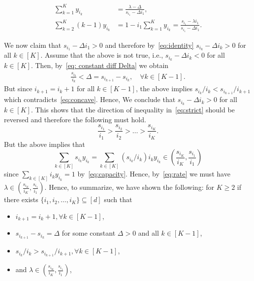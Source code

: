 \documentclass[a4paper]{article}
\theoremstyle{plain}
\theoremstyle{definition}
\theoremstyle{case}
\theoremstyle{remark}
\newcommand{\brac}[1]{\left(#1\right)}
\begin{document}
\begin{enumerate}
        \begin{align}
            \sum_{k=1}^K y_{i_k} &= \frac{\lambda - \Delta}{s_{i_1} - \Delta i_1}, \label{eq: first K sum subcase2}
            \\
            \sum_{k=2}^K (k-1) y_{i_k} &= 1- i_1\sum_{k=1}^K y_{i_k} = \frac{s_{i_1}-\lambda i_1}{s_{i_1}-\Delta i_1}. \label{eq: first K-1 sum subcase2}
        \end{align}

        We now claim that $s_{i_1}-\Delta i_{1} > 0$ and therefore by~\eqref{eq:identity} $s_{i_k}-\Delta i_k >0$ for all $k \in [K]$.
        Assume that the above is not true, i.e., $s_{i_k}-\Delta i_k < 0$ for all $k \in [K]$. Then, by~\eqref{eq: constant diff Delta} we obtain
        \begin{align}
            \frac{s_{i_k}}{i_k} < \Delta  = s_{i_{k+1}} - s_{i_k}, \quad \forall k \in [K-1].
            \label{eq:strict}
        \end{align}
        But since $i_{k+1}=i_k+1$ for all $k \in [K-1]$, the above implies $s_{i_{k}}/i_k < s_{i_{k+1}}/i_{k+1}$ which contradicts~\eqref{eq:concave}. Hence, We conclude that $s_{i_k}-\Delta i_k >0$ for all $k \in [K]$. This shows that the direction of inequality in~\eqref{eq:strict} should be reversed and therefore the following must hold.
        \begin{equation}
            \frac{s_{i_1}}{i_1} > \frac{s_{i_2}}{i_2} > \ldots > \frac{s_{i_K}}{i_K}.
        \end{equation}
        But the above implies that $$\sum_{k\in [K]} s_{i_k} y_{i_k}=\sum_{k\in [K]} (s_{i_k}/i_k) i_k y_{i_k} \in \brac{\frac{s_{i_K}}{i_K},\frac{s_{i_1}}{i_1}}$$ since $\sum_{k \in [K]} i_k y_{i_k}=1$ by~\eqref{eq:capacity}.
        Hence, by~\eqref{eq:rate} we must have
        $\lambda \in \brac{\frac{s_{i_K}}{i_K},\frac{s_{i_1}}{i_1}}$.
        Hence, to summarize, we have shown the following: for $K\geq 2$ if there exists $\{i_1,i_2,\ldots,i_K\}\subseteq[d]$ such that
        \begin{itemize}
            \item $i_{k+1}=i_k+1, \forall k\in [K-1]$,
            \item $s_{i_{k+1}}-s_{i_k} =\Delta $ for some  constant $\Delta >0$ and all $k \in [K-1]$,
            \item $s_{i_{k}}/i_k > s_{i_{k+1}}/i_{k+1}, \forall k \in [K-1]$,
            \item and $\lambda \in \brac{\frac{s_{i_K}}{i_K},\frac{s_{i_1}}{i_1}}$,

\end{itemize}
\end{enumerate}
\end{document}
